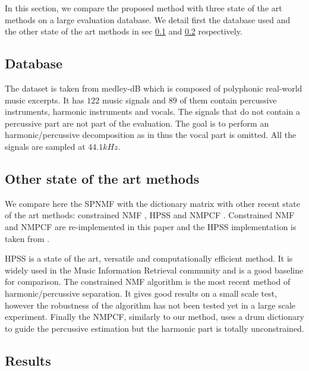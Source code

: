 \documentclass[journal]{IEEEtran}
\begin{document}
In this section, we compare the proposed method with three state of the art methods on a large evaluation database. We detail first the database used and the other state of the art methods in sec \ref{database} and \ref{soth} respectively.  


\subsection{Database}\label{database}

The dataset is taken from medley-dB \cite{bittner2014medleydb} which is composed of polyphonic real-world music excerpts. It has $122$ music signals and $89$ of them contain percussive instruments, harmonic instruments and vocals. The signals that do not contain a percussive part are not part of the evaluation. The goal is to perform an harmonic/percussive decomposition as in \cite{canadas2014percussive} thus the vocal part is omitted. All the signals are sampled at $44.1kHz$.

\subsection{Other state of the art methods}\label{soth}

We compare here the SPNMF with the dictionary matrix with other recent state of the art methods: constrained NMF \cite{canadas2014percussive}, HPSS \cite{fitzgerald2010harmonic} and NMPCF \cite{kim2011nonnegative}. Constrained NMF and NMPCF are re-implemented in this paper and the HPSS implementation is taken from \cite{DriedgerMueller14_TSMToolbox_DAFX}.

HPSS is a state of the art, versatile and computationally efficient method. It is widely used in the Music Information Retrieval community and is a good baseline for comparison. The constrained NMF algorithm is the most recent method of harmonic/percussive separation. It gives good results on a small scale test, however the robustness of the algorithm has not been tested yet in a large scale experiment. Finally the NMPCF, similarly to our method, uses a drum dictionary to guide the percussive estimation but the harmonic part is totally unconstrained. 


\subsection{Results} \label{subResults}
\end{document}
